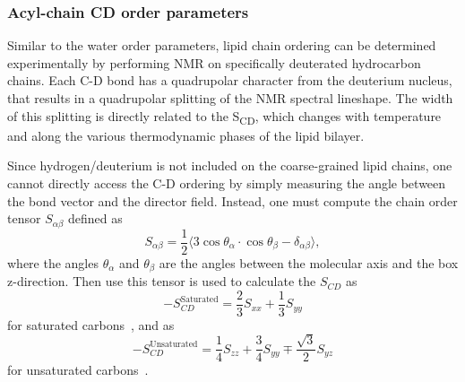 \subsubsection{Acyl-chain CD order parameters}
Similar to the water order parameters, lipid chain ordering can be determined experimentally by performing NMR 
on specifically deuterated hydrocarbon chains. Each C-D bond has a quadrupolar character from the deuterium nucleus, that results in
a quadrupolar splitting of the NMR spectral lineshape. The width of this splitting is directly related to the 
S\textsubscript{CD}, which changes with temperature and along the various thermodynamic phases of the lipid bilayer.

Since hydrogen/deuterium is not included on the coarse-grained lipid chains, 
one cannot directly access the C-D ordering by simply measuring the angle between the bond vector and the director field. 
Instead, one must compute the chain order tensor $S_{\alpha\beta}$ defined as
\begin{equation}
    S_{\alpha\beta}=\frac{1}{2}\big\langle
    3\cos{\theta_\alpha}\cdot\cos{\theta_\beta}-\delta_{\alpha\beta}\big\rangle,
    \nonumber
\end{equation}
where the angles $\theta_\alpha$ and $\theta_\beta$ are the angles between the molecular
axis and the box z-direction. 
Then use this tensor is used to calculate the $S_{CD}$ as
\begin{equation}
    -S_{CD}^{\text{Saturated}}=\frac{2}{3}S_{xx}+\frac{1}{3}S_{yy}
\end{equation}
for saturated carbons~\cite{egberts:1988}, and as
\begin{equation}
-S_{CD}^{\text{Unsaturated}}=\frac{1}{4}S_{zz}+\frac{3}{4}S_{yy}\mp \frac{\sqrt{3}}{2}S_{yz}
\end{equation}
for unsaturated carbons~\cite{Douliez:1995}.  
